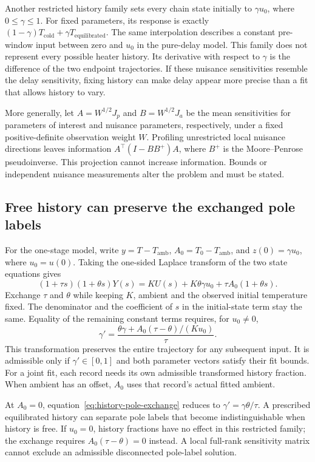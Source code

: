 \documentclass[11pt]{article}
\newcommand{\Tamb}{T_{\mathrm{amb}}}
\begin{document}
Another restricted history family sets every chain state initially to
$\gamma u_0$, where $0\leq\gamma\leq1$. For fixed parameters, its response is
exactly $(1-\gamma)T_{\mathrm{cold}}+\gamma T_{\mathrm{equilibrated}}$.
The same interpolation describes a constant pre-window input between zero and
$u_0$ in the pure-delay model. This family does not represent every possible
heater history. Its derivative with respect to $\gamma$ is the difference of
the two endpoint trajectories. If these nuisance sensitivities resemble the
delay sensitivity, fixing history can make delay appear more precise than a
fit that allows history to vary.

More generally, let $A=W^{1/2}J_p$ and $B=W^{1/2}J_a$ be the mean sensitivities
for parameters of interest and nuisance parameters, respectively, under a fixed
positive-definite observation weight $W$. Profiling unrestricted local nuisance
directions leaves information $A^\top(I-BB^+)A$, where $B^+$ is the
Moore--Penrose pseudoinverse. This projection cannot increase information.
Bounds or independent nuisance measurements alter the problem and must be stated.

\subsection{Free history can preserve the exchanged pole labels}
For the one-stage model, write $y=T-\Tamb$, $A_0=T_0-\Tamb$, and
$z(0)=\gamma u_0$, where $u_0=u(0)$. Taking the one-sided Laplace transform
of the two state equations gives
\[
 (1+\tau s)(1+\theta s)Y(s)
 =K U(s)+K\theta\gamma u_0+\tau A_0(1+\theta s).
\]
Exchange $\tau$ and $\theta$ while keeping $K$, ambient and the observed
initial temperature fixed. The denominator and the coefficient of $s$ in the
initial-state term stay the same. Equality of the remaining constant terms
requires, for $u_0\ne0$,
\begin{equation}
 \gamma'=\frac{\theta\gamma+A_0(\tau-\theta)/(K u_0)}{\tau}.
 \label{eq:history-pole-exchange}
\end{equation}
This transformation preserves the entire trajectory for any subsequent input.
It is admissible only if $\gamma'\in[0,1]$ and both parameter vectors satisfy
their fit bounds. For a joint fit, each record needs its own admissible
transformed history fraction. When ambient has an offset, $A_0$ uses that
record's actual fitted ambient.

At $A_0=0$, equation~\eqref{eq:history-pole-exchange} reduces to
$\gamma'=\gamma\theta/\tau$. A prescribed equilibrated history can separate
pole labels that become indistinguishable when history is free. If $u_0=0$,
history fractions have no effect in this restricted family; the exchange
requires $A_0(\tau-\theta)=0$ instead. A local full-rank sensitivity matrix
cannot exclude an admissible disconnected pole-label solution.
\end{document}

